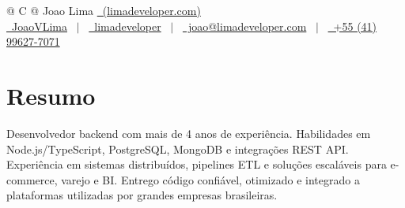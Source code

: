 \documentclass[a4paper,12pt]{article}
\begin{document}
    \pagestyle{empty}



    \begin{tabularx}{\linewidth}{@{} C @{}}
        \Huge{Joao Lima} \href{https://limadeveloper.com}{\raisebox{-0.05\height}\ (limadeveloper.com)} \ \\[7.5pt]
        \href{https://github.com/JoaoVLima}{\raisebox{-0.05\height}\faGithub\ JoaoVLima} \ $|$ \
        \href{https://linkedin.com/in/limadeveloper}{\raisebox{-0.05\height}\faLinkedin\ limadeveloper} \ $|$ \
        \href{mailto:joao@limadeveloper.com}{\raisebox{-0.05\height}\faEnvelope \ joao@limadeveloper.com} \ $|$ \
        \href{tel:+5541996277071}{\raisebox{-0.05\height}\faMobile \ +55 (41) 99627-7071} \\
    \end{tabularx}




    \section{Resumo}
    Desenvolvedor backend com mais de 4 anos de experiência. Habilidades em Node.js/TypeScript, PostgreSQL, MongoDB e integrações REST API. Experiência em sistemas distribuídos, pipelines ETL e soluções escaláveis para e-commerce, varejo e BI. Entrego código confiável, otimizado e integrado a plataformas utilizadas por grandes empresas brasileiras.
\end{document}
